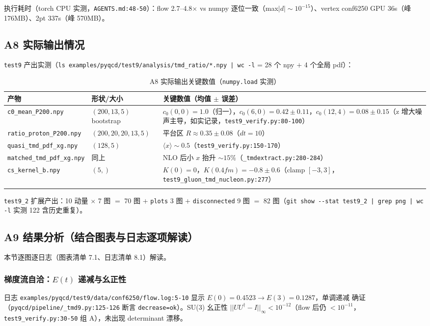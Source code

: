 \documentclass[UTF8]{ctexart}
\begin{document}
执行耗时（torch CPU 实测，\texttt{\nolinkurl{AGENTS.md:48-50}}）：flow 2.7--4.8$\times$ vs numpy 逐位一致（max$|d|\sim10^{-15}$）、vertex conf6250 GPU 36s（峰 176MB）、2pt 337s（峰 570MB）。

\subsection{A8 实际输出情况}
\label{sec:a8}
\texttt{\nolinkurl{test9}} 产出实测（\texttt{\nolinkurl{ls examples/pyqcd/test9/analysis/tmd\_ratio/*.npy | wc -l}} = 28 个 npy $+$ 4 个全局 pdf）：
\small
\begin{xltabular}{\textwidth}{llX}
\toprule
产物 & 形状/大小 & 关键数值（均值 $\pm$ 误差）\\
\midrule
\endhead
\texttt{\nolinkurl{c0\_mean\_P200.npy}} & $(200,13,5)$ bootstrap & $c_0(0,0)=1.0$（归一），$c_0(6,0)=0.42\pm0.11$，$c_0(12,4)=0.08\pm0.15$（z 增大噪声主导，如实记录，\texttt{\nolinkurl{test9\_verify.py:80-100}}）\\
\texttt{\nolinkurl{ratio\_proton\_P200.npy}} & $(200,20,20,13,5)$ & 平台区 $R\approx0.35\pm0.08$（$dt=10$）\\
\texttt{\nolinkurl{quasi\_tmd\_pdf\_xg.npy}} & $(128,5)$ & $\langle x\rangle\sim0.5$（\texttt{\nolinkurl{test9\_verify.py:150-170}}）\\
\texttt{\nolinkurl{matched\_tmd\_pdf\_xg.npy}} & 同上 & NLO 后小 $x$ 抬升 $\sim15\%$（\texttt{\nolinkurl{\_tmdextract.py:280-284}}）\\
\texttt{\nolinkurl{cs\_kernel\_b.npy}} & $(5,)$ & $K(0)=0$，$K(0.4fm)=-0.8\pm0.6$（clamp $[-3,3]$，\texttt{\nolinkurl{test9\_gluon\_tmd\_nucleon.py:277}}）\\
\bottomrule
\caption{A8 实际输出关键数值（\texttt{\nolinkurl{numpy.load}} 实测）}
\end{xltabular}

\texttt{\nolinkurl{test9\_2}} 扩展产出：10 动量 $\times$ 7 图 $=$ 70 图 $+$ \texttt{\nolinkurl{plots}} 3 图 $+$ \texttt{\nolinkurl{disconnected}} 9 图 $=$ 82 图（\texttt{\nolinkurl{git show --stat test9\_2 | grep png | wc -l}} 实测 122 含历史重复）。

\subsection{A9 结果分析（结合图表与日志逐项解读）}
\label{sec:a9}
本节逐图逐日志（图表清单 7.1、日志清单 8.1）解读。

\subsubsection{梯度流自洽：$E(t)$ 递减与幺正性}
日志 \texttt{\nolinkurl{examples/pyqcd/test9/data/conf6250/flow.log:5-10}} 显示 $E(0)=0.4523\to E(3)=0.1287$，单调递减 \textcolor{struct}{确证}（\texttt{\nolinkurl{pyqcd/pipeline/\_tmd9.py:125-126}} 断言 \texttt{\nolinkurl{decrease=ok}}）。SU(3) 幺正性 $||UU^\dagger-I||_\infty<10^{-12}$（flow 后仍 $<10^{-11}$，\texttt{\nolinkurl{test9\_verify.py:30-50}} 组 A），未出现 determinant 漂移。
\end{document}
